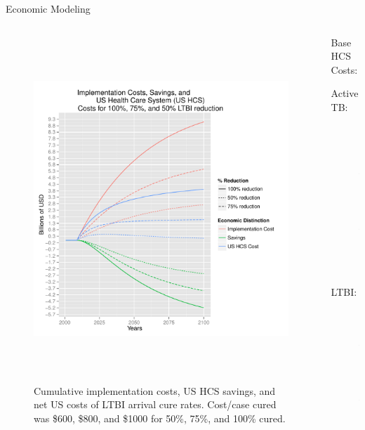 \documentclass[final]{beamer}
\begin{document}
\begin{frame}
\begin{columns}[T]
\begin{column}{.3\textwidth}
\begin{block}{Economic Modeling}
        \begin{columns}[T]
          \begin{column}{.66\textwidth}
            \begin{figure}[h]
              \begin{center}
                \includegraphics[width=\textwidth,height=13cm]{EnLTBIRedGroupCost.pdf}
              \end{center}
              \caption{Cumulative implementation costs, US HCS savings, and net
                       US costs of LTBI arrival cure rates. Cost/case cured was
                       \$600, \$800, and \$1000 for 50\%, 75\%, and 100\%
                       cured.}
              \label{fig:redEnLTBI_costs}
            \end{figure}
          \end{column}
          \begin{column}{.26\textwidth}
            Base HCS Costs:
            \begin{description}
              \item[Active TB:]\hfill \\ 
                \$14,014.90
              \item[LTBI:]\hfill \\ 
                \$403.45
            \end{description}
          \end{column}
        \end{columns}
      \end{block}
    \end{column}


\end{columns}
\end{frame}
\end{document}

